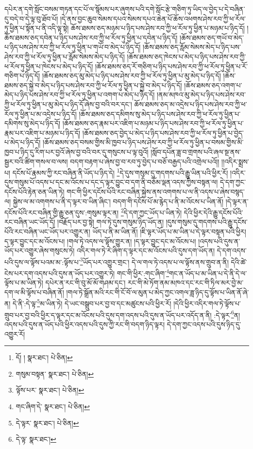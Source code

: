 དཔེར་ན་དགེ་སློང་བསམ་གཏན་དང་པོ་ལ་སྙོམས་པར་ཞུགས་པའི་དགེ་སློང་རྩེ་གཅིག་ཏུ་ཡིད་ལ་བྱེད་པ་དེ་བཞིན་དུ་བདེ་བ་དེ་ལྟ་བུ་ཐོབ་པོ། །དེ་ནས་བྱང་ཆུབ་སེམས་དཔའ་སེམས་དཔའ་ཆེན་པོ་ཆོས་འཕགས་ཤེས་རབ་ཀྱི་ཕ་རོལ་ཏུ་ཕྱིན་པ་སྟོན་པ་ནི་འདི་ལྟ་སྟེ། ཆོས་ཐམས་ཅད་མཉམ་པ་ཉིད་པས་ཤེས་རབ་ཀྱི་ཕ་རོལ་ཏུ་ཕྱིན་པ་མཉམ་པ་ཉིད་དོ། །ཆོས་ཐམས་ཅད་དབེན་པ་ཉིད་པས་ཤེས་རབ་ཀྱི་ཕ་རོལ་ཏུ་ཕྱིན་པ་དབེན་པ་ཉིད་དོ། །ཆོས་ཐམས་ཅད་གཡོ་བ་མེད་པ་ཉིད་པས་ཤེས་རབ་ཀྱི་ཕ་རོལ་ཏུ་ཕྱིན་པ་གཡོ་བ་མེད་པ་ཉིད་དོ། །ཆོས་ཐམས་ཅད་རློམ་སེམས་མེད་པ་ཉིད་པས་ཤེས་རབ་ཀྱི་ཕ་རོལ་ཏུ་ཕྱིན་པ་རློམ་སེམས་མེད་པ་ཉིད་དོ། །ཆོས་ཐམས་ཅད་ཁེངས་པ་མེད་པ་ཉིད་པས་ཤེས་རབ་ཀྱི་ཕ་རོལ་ཏུ་ཕྱིན་པ་ཁེངས་པ་མེད་པ་ཉིད་དོ། །ཆོས་ཐམས་ཅད་རོ་གཅིག་པ་ཉིད་པས་ཤེས་རབ་ཀྱི་ཕ་རོལ་ཏུ་ཕྱིན་པ་རོ་གཅིག་པ་ཉིད་དོ། །ཆོས་ཐམས་ཅད་མུ་མེད་པ་ཉིད་པས་ཤེས་རབ་ཀྱི་ཕ་རོལ་ཏུ་ཕྱིན་པ་མུ་མེད་པ་ཉིད་དོ། །ཆོས་ཐམས་ཅད་སྐྱེ་བ་མེད་པ་ཉིད་པས་ཤེས་རབ་ཀྱི་ཕ་རོལ་ཏུ་ཕྱིན་པ་སྐྱེ་བ་མེད་པ་ཉིད་དོ། །ཆོས་ཐམས་ཅད་འགག་པ་མེད་པ་ཉིད་པས་ཤེས་རབ་ཀྱི་ཕ་རོལ་ཏུ་ཕྱིན་པ་འགག་པ་མེད་པ་ཉིད་དོ། །ནམ་མཁའ་མུ་མེད་པ་ཉིད་པས་ཤེས་རབ་ཀྱི་ཕ་རོལ་ཏུ་ཕྱིན་པ་མུ་མེད་པ་ཉིད་དོ་ཞེས་བྱ་བའི་བར་དང་། ཆོས་ཐམས་ཅད་མ་འདྲེས་པ་ཉིད་པས་ཤེས་རབ་ཀྱི་ཕ་རོལ་ཏུ་ཕྱིན་པ་མ་འདྲེས་པ་ཉིད་དོ། །ཆོས་ཐམས་ཅད་དམིགས་སུ་མེད་པ་ཉིད་པས་ཤེས་རབ་ཀྱི་ཕ་རོལ་ཏུ་ཕྱིན་པ་དམིགས་སུ་མེད་པ་ཉིད་དོ། །ཆོས་ཐམས་ཅད་རྣམ་པར་འཇིག་པ་མཉམ་པ་ཉིད་པས་ཤེས་རབ་ཀྱི་ཕ་རོལ་ཏུ་ཕྱིན་པ་རྣམ་པར་འཇིག་པ་མཉམ་པ་ཉིད་དོ། །ཆོས་ཐམས་ཅད་བྱེད་པ་མེད་པ་ཉིད་པས་ཤེས་རབ་ཀྱི་ཕ་རོལ་ཏུ་ཕྱིན་པ་བྱེད་པ་མེད་པ་ཉིད་དོ། །ཆོས་ཐམས་ཅད་བསམ་གྱིས་མི་ཁྱབ་པ་ཉིད་པས་ཤེས་རབ་ཀྱི་ཕ་རོལ་ཏུ་ཕྱིན་པ་བསམ་གྱིས་མི་ཁྱབ་པ་ཉིད་དུ་རིག་པར་བྱའོ་ཞེས་བྱ་བའི་བར་དུ་གསུངས་པ་ལྟ་བུའོ། །སློབ་དཔོན་ཟླ་བ་གྲགས་པའི་ཞལ་སྔ་ནས་སྦྱར་བའི་ཚིག་གསལ་བ་ལས། བདག་བརྟག་པ་ཞེས་བྱ་བ་རབ་ཏུ་བྱེད་པ་བཅོ་བརྒྱད་པའི་འགྲེལ་པའོ།། །།འདིར་སྨྲས་པ། དངོས་པོ་རྣམས་ཀྱི་རང་བཞིན་ནི་ཡོད་པ་ཉིད་དེ། \footnote{དོ། །   སྣར་ཐང་།  པེ་ཅིན། }དེ་དུས་གསུམ་དུ་གདགས་པའི་རྒྱུ་ཡིན་པའི་ཕྱིར་རོ། །འདིར་དུས་གསུམ་པོ་འདས་པ་དང་མ་འོངས་པ་དང་ད་ལྟར་བྱུང་བ་དག་ནི་བཅོམ་ལྡན་འདས་ཀྱིས་བསྟན་ལ། དེ་དག་ཀྱང་དངོས་པོའི་རྟེན་ཅན་ཡིན་ཏེ། གང་གི་ཕྱིར་དངོས་པོའི་རང་བཞིན་སྐྱེས་ནས་འགགས་པ་ལ་ནི་འདས་པ་ཞེས་བསྙད་ལ། སྐྱེས་ལ་མ་འགགས་པ་ནི་ད་ལྟར་བ་ཡིན་ཞིང་། བདག་གི་དངོས་པོ་མ་རྙེད་པ་ནི་མ་འོངས་པ་ཡིན་ནོ། །དེ་ལྟར་ན་དངོས་པོའི་རང་བཞིན་གྱི་རྒྱུ་ཅན་དུས་:གསུམ་ལྟར་ན། \footnote{གསུམ་བསྟན་  སྣར་ཐང་།  པེ་ཅིན། }དེ་དག་ཀྱང་ཡོད་པ་ཡིན་ཏེ། དེའི་ཕྱིར་དེའི་རྒྱུ་དངོས་པོའི་རང་བཞིན་ཡང་ཡོད་དོ། །བརྗོད་པར་བྱ་སྟེ། གལ་ཏེ་དུས་གསུམ་ཉིད་ཡོད་ན། །དུས་གསུམ་དུ་གདགས་པའི་རྒྱུ་དངོས་པོའི་རང་བཞིན་ཡང་ཡོད་པར་འགྱུར་ན། ཡོད་པ་ནི་མ་ཡིན་ནོ། །ཇི་ལྟར་ཡོད་པ་མ་ཡིན་པ་དེ་ལྟར་བསྟན་པའི་ཕྱིར། ད་ལྟར་བྱུང་དང་མ་འོངས་པ། །གལ་ཏེ་འདས་ལ་ལྟོས་གྱུར་ན། །ད་ལྟར་བྱུང་དང་མ་འོངས་པ། །འདས་པའི་དུས་ན་ཡོད་པར་འགྱུར་ཞེས་གསུངས་ཏེ། འདིར་གལ་ཏེ་རེ་ཞིག་ད་ལྟར་དང་མ་འོངས་པའི་དུས་དག་ཡོད་ན། དེ་དག་འདས་པའི་དུས་ལ་ལྟོས་པའམ་མ་:ལྟོས་པ་\footnote{ལྟོས་པར་  སྣར་ཐང་།  པེ་ཅིན། }ཡོད་པར་འགྱུར་གྲང་། དེ་ལ་གལ་ཏེ་འདས་པ་ལ་ལྟོས་ནས་གྲུབ་ན་ནི། དེའི་ཚེ་ངེས་པར་དག་འདས་པའི་དུས་ན་ཡོད་པར་འགྱུར་ཏེ། གང་གི་ཕྱིར་:གང་ཞིག་\footnote{གང་ཞིག་དེ་  སྣར་ཐང་།  པེ་ཅིན། }གང་ན་ཡོད་པ་མ་ཡིན་པ་དེ་ནི་དེ་ལ་ལྟོས་པ་མ་ཡིན་ཏེ། དཔེར་ན་རང་གི་བུ་མོ་མོ་གཤམ་དང་། རང་གི་མེ་ཏོག་ནམ་མཁའ་དང་རང་གི་ཏིལ་མར་བྱེ་མ་དག་ལ་མི་ལྟོས་པ་བཞིན་ནོ། །གལ་ཏེ་སྒྲོན་མའི་རང་གི་ངོ་བོ་ལ་མུན་པ་མེད་ཀྱང་འགལ་ཟླ་ཉིད་དུ་ལྟོས་པ་ཡིན་ནོ་ཞེ་ན། དེ་ནི་:དེ་ལྟ་\footnote{དེ་ལྟར་  སྣར་ཐང་།  པེ་ཅིན། }མ་ཡིན་ཏེ། དེ་ཡང་བསྒྲུབ་པར་བྱ་བ་དང་མཚུངས་པའི་ཕྱིར་རོ། །དེའི་ཕྱིར་འདིར་གལ་ཏེ་ལྟོས་པ་གྲུབ་པར་བྱ་བའི་ཕྱིར་ད་ལྟར་དང་མ་འོངས་པའི་དུས་དག་འདས་པའི་དུས་ན་ཡོད་པར་འདོད་ན་ནི། :དེ་ལྟར་\footnote{དེ་ལྟ་  སྣར་ཐང་། }ན། འདས་པའི་དུས་ན་ཡོད་པའི་ཕྱིར་འདས་པའི་དུས་ཀྱི་རང་གི་བདག་ཉིད་ལྟར། དེ་དག་ཀྱང་འདས་པའི་དུས་ཉིད་དུ་འགྱུར་རོ། 